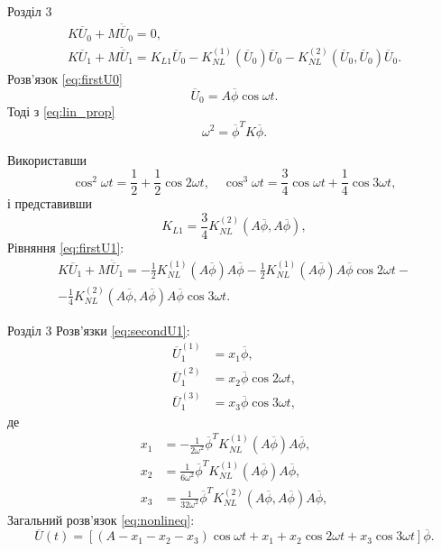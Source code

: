 \documentclass[8pt]{beamer}
\numberwithin{figure}{section}
\numberwithin{equation}{section}
\numberwithin{table}{section}
\begin{document}
\begin{frame}{Розділ 3}
\begin{gather}
\label{eq:firstU0}
K\overline{U}_0+M\ddot{\overline{U}}_0=0,\\
\label{eq:firstU1}
K\overline{U}_1+M\ddot{\overline{U}}_1=K_{L1}\overline{U}_0-K_{NL}^{(1)}\left( \overline{U}_0 \right) \overline{U}_0-K_{NL}^{(2)}\left( \overline{U}_0,\overline{U}_0\right)\overline{U}_0.
\end{gather}
Розв'язок \eqref{eq:firstU0}
\begin{equation}
\overline{U}_0=A\overline{\phi}\cos\omega t.
\end{equation}
Тоді з \eqref{eq:lin_prop}
\begin{equation}
\omega^2=\overline{\phi}^T K \overline{\phi}.
\end{equation}

Використавши
\begin{equation}
\cos^2 \omega t = \frac12 + \frac12 \cos 2 \omega t , \quad
\cos^3 \omega t = \frac34 \cos \omega t + \frac14 \cos 3 \omega t,
\end{equation}
і представивши
\begin{equation}
K_{L1} = \frac34 K_{NL}^{(2)}\left( A\overline{\phi},A\overline{\phi} \right),
\end{equation}
Рівняння \eqref{eq:firstU1}:
\begin{multline}\label{eq:secondU1}
K\overline{U}_1+M\ddot{\overline{U}}_1=-\frac12 K_{NL}^{(1)}\left( A\overline{\phi} \right) A\overline{\phi} -\frac12 K_{NL}^{(1)}\left( A\overline{\phi} \right) A\overline{\phi} \cos 2\omega t -\\ - \frac14 K_{NL}^{(2)}\left( A\overline{\phi},A\overline{\phi}\right)A\overline{\phi} \cos 3\omega t.
\end{multline}

\end{frame}


\begin{frame}{Розділ 3}
Розв'язки \eqref{eq:secondU1}:
\begin{align}
\overline{U}_1^{(1)}&=x_1\overline{\phi},\\
\overline{U}_1^{(2)}&=x_2\overline{\phi}\cos 2\omega t,\\
\overline{U}_1^{(3)}&=x_3\overline{\phi}\cos 3\omega t,
\end{align}
де
\begin{align}
x_1&=-\frac{1}{2\omega ^2}\overline{\phi}^T K_{NL}^{(1)}\left( A\overline{\phi} \right) A\overline{\phi},\\
x_2&=\frac{1}{6\omega ^2}\overline{\phi}^T K_{NL}^{(1)}\left( A\overline{\phi} \right) A\overline{\phi},\\
x_3&=\frac{1}{32\omega ^2}\overline{\phi}^T K_{NL}^{(2)}\left( A\overline{\phi},A\overline{\phi} \right) A\overline{\phi},
\end{align}
Загальний розв'язок \eqref{eq:nonlineq}:
\begin{equation}
\overline{U}\left(t\right)=\left[\left(A-x_1-x_2-x_3\right)\cos \omega t + x_1+x_2\cos 2 \omega t+x_3\cos 3 \omega t\right]\overline{\phi}.
\end{equation}
\end{frame}
\end{document}
